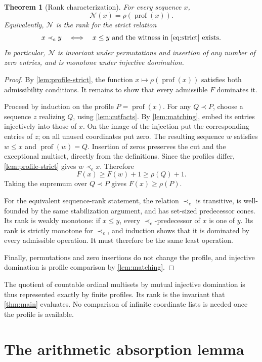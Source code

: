 \documentclass[11pt,a4paper]{article}
\newtheorem{theorem}{Theorem}[section]
\theoremstyle{definition}
\newcommand{\OpN}{\mathcal N}
\newcommand{\prof}{\operatorname{prof}}
\newcommand{\eord}{\mathrel{\prec_e}}
\begin{document}
\begin{theorem}[Rank characterization]\label{thm:rank}
For every sequence $x$,
\begin{equation}\label{eq:rankN}
 \OpN(x)=\rho(\prof(x)).
\end{equation}
Equivalently, $\OpN$ is the rank for the strict relation
\[
 x\eord y\quad\Longleftrightarrow\quad
 x\le y\text{ and the witness in \eqref{eq:strict} exists}.
\]
In particular, $\OpN$ is invariant under permutations and insertion of any
number of zero entries, and is monotone under injective domination.
\end{theorem}
\begin{proof}
By \cref{lem:profile-strict}, the function $x\mapsto\rho(\prof(x))$ satisfies
both admissibility conditions. It remains to show that every admissible
$F$ dominates it.

Proceed by induction on the profile $P=\prof(x)$. For any $Q\prec P$, choose
a sequence $z$ realizing $Q$, using \cref{lem:cutfacts}. By
\cref{lem:matching}, embed its entries injectively into those of $x$. On the
image of the injection put the corresponding entries of $z$; on all unused
coordinates put zero. The resulting sequence $w$ satisfies $w\le x$ and
$\prof(w)=Q$. Insertion of zeros preserves the cut and the exceptional
multiset, directly from the definitions. Since the profiles differ,
\cref{lem:profile-strict} gives $w\eord x$. Therefore
\[
 F(x)\ge F(w)+1\ge\rho(Q)+1.
\]
Taking the supremum over $Q\prec P$ gives $F(x)\ge\rho(P)$.

For the equivalent sequence-rank statement, the relation $\eord$ is
transitive, is well-founded by the same stabilization argument, and has
set-sized predecessor cones. Its rank is weakly monotone: if $x\le y$, every
$\eord$-predecessor of $x$ is one of $y$. Its rank is strictly monotone for
$\eord$, and induction shows that it is dominated by every admissible
operation. It must therefore be the same least operation.

Finally, permutations and zero insertions do not change the profile, and
injective domination is profile comparison by \cref{lem:matching}.
\end{proof}

The quotient of countable ordinal multisets by mutual injective domination
is thus represented exactly by finite profiles. Its rank is the invariant
that \cref{thm:main} evaluates. No comparison of infinite coordinate lists is
needed once the profile is available.

\section{The arithmetic absorption lemma}\label{sec:absorption}
\end{document}
